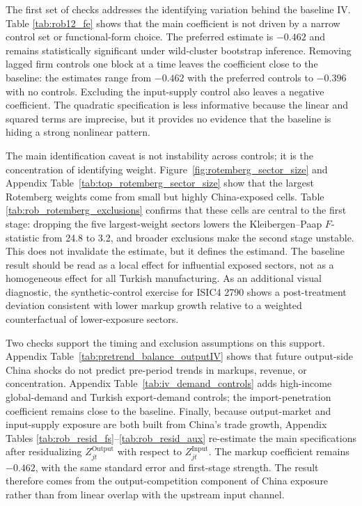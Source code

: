 ﻿\documentclass[12pt]{article}
\begin{document}
The first set of checks addresses the identifying variation behind the baseline IV. Table \ref{tab:rob12_fe} shows that the main coefficient is not driven by a narrow control set or functional-form choice. The preferred estimate is $-0.462$ and remains statistically significant under wild-cluster bootstrap inference. Removing lagged firm controls one block at a time leaves the coefficient close to the baseline: the estimates range from $-0.462$ with the preferred controls to $-0.396$ with no controls. Excluding the input-supply control also leaves a negative coefficient. The quadratic specification is less informative because the linear and squared terms are imprecise, but it provides no evidence that the baseline is hiding a strong nonlinear pattern.

The main identification caveat is not instability across controls; it is the concentration of identifying weight. Figure~\ref{fig:rotemberg_sector_size} and Appendix Table~\ref{tab:top_rotemberg_sector_size} show that the largest Rotemberg weights come from small but highly China-exposed cells. Table \ref{tab:rob_rotemberg_exclusions} confirms that these cells are central to the first stage: dropping the five largest-weight sectors lowers the Kleibergen--Paap \(F\)-statistic from 24.8 to 3.2, and broader exclusions make the second stage unstable. This does not invalidate the estimate, but it defines the estimand. The baseline result should be read as a local effect for influential exposed sectors, not as a homogeneous effect for all Turkish manufacturing. As an additional visual diagnostic, the synthetic-control exercise \parencite{abadieUsingSyntheticControls2021} for ISIC4 2790 shows a post-treatment deviation consistent with lower markup growth relative to a weighted counterfactual of lower-exposure sectors.

Two checks support the timing and exclusion assumptions on this support. Appendix Table~\ref{tab:pretrend_balance_outputIV} shows that future output-side China shocks do not predict pre-period trends in markups, revenue, or concentration. Appendix Table~\ref{tab:iv_demand_controls} adds high-income global-demand and Turkish export-demand controls; the import-penetration coefficient remains close to the baseline. Finally, because output-market and input-supply exposure are both built from China's trade growth, Appendix Tables \ref{tab:rob_resid_fs}--\ref{tab:rob_resid_aux} re-estimate the main specifications after residualizing \(Z^{\text{Output}}_{jt}\) with respect to \(Z^{\text{Input}}_{jt}\). The markup coefficient remains $-0.462$, with the same standard error and first-stage strength. The result therefore comes from the output-competition component of China exposure rather than from linear overlap with the upstream input channel.
\end{document}
